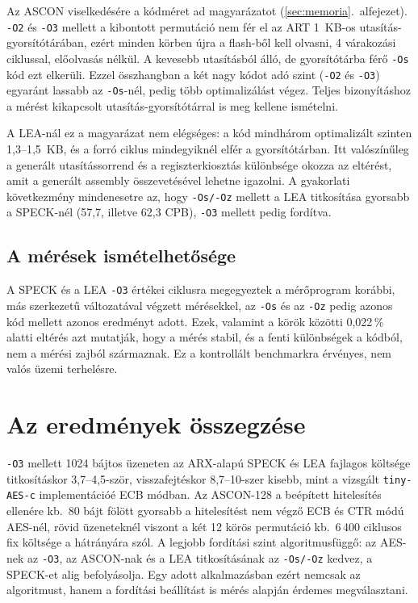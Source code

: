 \documentclass[a4paper,12pt]{report}
\theoremstyle{definition}
\theoremstyle{remark}
\begin{document}
Az ASCON viselkedésére a kódméret ad magyarázatot (\ref{sec:memoria}.~alfejezet). \texttt{-O2} és \texttt{-O3} mellett a kibontott permutáció nem fér el az ART 1~KB-os utasítás-gyorsítótárában, ezért minden körben újra a flash-ből kell olvasni, 4 várakozási ciklussal, előolvasás nélkül. A kevesebb utasításból álló, de gyorsítótárba férő \texttt{-Os} kód ezt elkerüli. Ezzel összhangban a két nagy kódot adó szint (\texttt{-O2} és \texttt{-O3}) egyaránt lassabb az \texttt{-Os}-nél, pedig több optimalizálást végez. Teljes bizonyításhoz a mérést kikapcsolt utasítás-gyorsítótárral is meg kellene ismételni.

A LEA-nál ez a magyarázat nem elégséges: a kód mindhárom optimalizált szinten 1,3--1,5~KB, és a forró ciklus mindegyiknél elfér a gyorsítótárban. Itt valószínűleg a generált utasítássorrend és a regiszterkiosztás különbsége okozza az eltérést, amit a generált assembly összevetésével lehetne igazolni. A gyakorlati következmény mindenesetre az, hogy \texttt{-Os/-Oz} mellett a LEA titkosítása gyorsabb a SPECK-nél (57,7, illetve 62,3 CPB), \texttt{-O3} mellett pedig fordítva.

\subsection{A mérések ismételhetősége}

A SPECK és a LEA \texttt{-O3} értékei ciklusra megegyeztek a mérőprogram korábbi, más szerkezetű változatával végzett mérésekkel, az \texttt{-Os} és az \texttt{-Oz} pedig azonos kód mellett azonos eredményt adott. Ezek, valamint a körök közötti 0,022\,\% alatti eltérés azt mutatják, hogy a mérés stabil, és a fenti különbségek a kódból, nem a mérési zajból származnak. Ez a kontrollált benchmarkra érvényes, nem valós üzemi terhelésre.

\section{Az eredmények összegzése}\label{sec:osszesites}

\texttt{-O3} mellett 1024 bájtos üzeneten az ARX-alapú SPECK és LEA fajlagos költsége titkosításkor 3,7--4,5-ször, visszafejtéskor 8,7--10-szer kisebb, mint a vizsgált \texttt{tiny-AES-c} implementációé ECB módban. Az ASCON-128 a beépített hitelesítés ellenére kb.\ 80 bájt fölött gyorsabb a hitelesítést nem végző ECB és CTR módú AES-nél, rövid üzeneteknél viszont a két 12 körös permutáció kb.\ 6\,400 ciklusos fix költsége a hátrányára szól. A legjobb fordítási szint algoritmusfüggő: az AES-nek az \texttt{-O3}, az ASCON-nak és a LEA titkosításának az \texttt{-Os/-Oz} kedvez, a SPECK-et alig befolyásolja. Egy adott alkalmazásban ezért nemcsak az algoritmust, hanem a fordítási beállítást is mérés alapján érdemes megválasztani.
\end{document}
